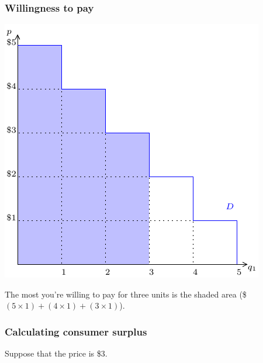 \documentclass[xcolor=pdftex,dvipsnames]{beamer}
\begin{document}
\begin{frame}
\frametitle{Willingness to pay}
\begin{center}
\includegraphics[scale=0.9]{pics/ConsumerWelfare4}
\end{center}
The most you're willing to pay for three units is the shaded area
(\$$(5\times 1) + (4\times 1) + (3\times 1)$).
\end{frame}



\begin{frame}
\frametitle{Calculating consumer surplus}
Suppose that the price is \$3. 
\bigskip


\end{frame}
\end{document}
